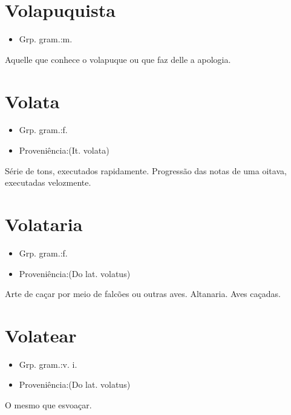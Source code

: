 \documentclass{article}
\begin{document}
\section{Volapuquista}
\begin{itemize}
\item {Grp. gram.:m.}
\end{itemize}
Aquelle que conhece o volapuque ou que faz delle a apologia.
\section{Volata}
\begin{itemize}
\item {Grp. gram.:f.}
\end{itemize}
\begin{itemize}
\item {Proveniência:(It. \textunderscore volata\textunderscore )}
\end{itemize}
Série de tons, executados rapidamente.
Progressão das notas de uma oitava, executadas velozmente.
\section{Volataria}
\begin{itemize}
\item {Grp. gram.:f.}
\end{itemize}
\begin{itemize}
\item {Proveniência:(Do lat. \textunderscore volatus\textunderscore )}
\end{itemize}
Arte de caçar por meio de falcões ou outras aves.
Altanaria.
Aves caçadas.
\section{Volatear}
\begin{itemize}
\item {Grp. gram.:v. i.}
\end{itemize}
\begin{itemize}
\item {Proveniência:(Do lat. \textunderscore volatus\textunderscore )}
\end{itemize}
O mesmo que \textunderscore esvoaçar\textunderscore .
\end{document}
